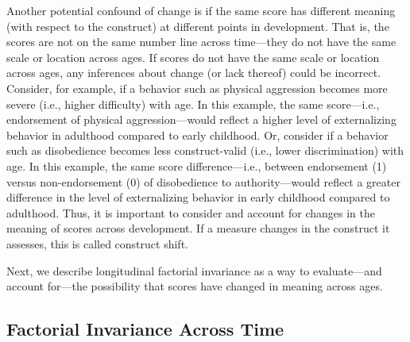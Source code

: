 \documentclass[
  american,
  letterpaper,
  12pt]{article}
\begin{document}
Another potential confound of change is if the same score has different
meaning (with respect to the construct) at different points in
development. That is, the scores are not on the same number line across
time---they do not have the same scale or location across ages. If
scores do not have the same scale or location across ages, any
inferences about change (or lack thereof) could be incorrect. Consider,
for example, if a behavior such as physical aggression becomes more
severe (i.e., higher difficulty) with age. In this example, the same
score---i.e., endorsement of physical aggression---would reflect a
higher level of externalizing behavior in adulthood compared to early
childhood. Or, consider if a behavior such as disobedience becomes less
construct-valid (i.e., lower discrimination) with age. In this example,
the same score difference---i.e., between endorsement (1) versus
non-endorsement (0) of disobedience to authority---would reflect a
greater difference in the level of externalizing behavior in early
childhood compared to adulthood. Thus, it is important to consider and
account for changes in the meaning of scores across development. If a
measure changes in the construct it assesses, this is called construct
shift.

Next, we describe longitudinal factorial invariance as a way to
evaluate---and account for---the possibility that scores have changed in
meaning across ages.

\subsection{Factorial Invariance Across
Time}\label{factorial-invariance-across-time}
\end{document}
